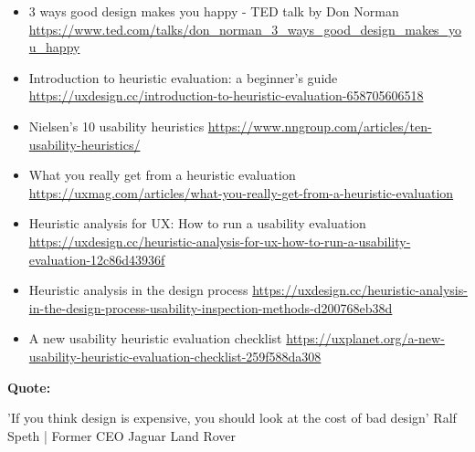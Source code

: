 \begin{itemize}
\item 3 ways good design makes you happy - TED talk by Don Norman \url{https://www.ted.com/talks/don_norman_3_ways_good_design_makes_you_happy}
\item Introduction to heuristic evaluation: a beginner's guide \url{https://uxdesign.cc/introduction-to-heuristic-evaluation-658705606518}
\item Nielsen's 10 usability heuristics \url{https://www.nngroup.com/articles/ten-usability-heuristics/}
\item What you really get from a heuristic evaluation \url{https://uxmag.com/articles/what-you-really-get-from-a-heuristic-evaluation}
\item Heuristic analysis for UX: How to run a usability evaluation \url{https://uxdesign.cc/heuristic-analysis-for-ux-how-to-run-a-usability-evaluation-12c86d43936f}
\item Heuristic analysis in the design process \url{https://uxdesign.cc/heuristic-analysis-in-the-design-process-usability-inspection-methods-d200768eb38d}
\item A new usability heuristic evaluation checklist \url{https://uxplanet.org/a-new-usability-heuristic-evaluation-checklist-259f588da308}
\end{itemize}

\textbf{Quote:}

'If you think design is expensive, you should look at the cost of bad design' Ralf Speth | Former CEO Jaguar Land Rover

